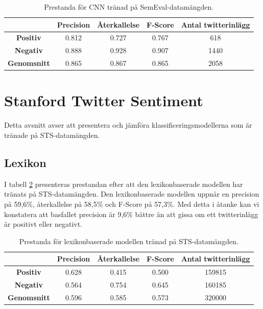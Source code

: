 \documentclass{kaumasters} %
\begin{document}
\begin{table}[H]
\centering
\caption{Prestanda för CNN tränad på SemEval-datamängden.}
\label{tab:cnn_se}
    \begin{tabular}{ccccc}
    \toprule
     & \textbf{Precision} & \textbf{Återkallelse} & \textbf{F-Score} & \textbf{Antal twitterinlägg}  \\
    \midrule
    \textbf{Positiv} & 0.812 & 0.727 & 0.767 & 618 \\
    \textbf{Negativ} & 0.888 & 0.928 & 0.907 & 1440 \\
    \midrule
    \textbf{Genomsnitt} & 0.865 & 0.867 & 0.865  & 2058 \\
    \bottomrule
\end{tabular}
\end{table}

\section{Stanford Twitter Sentiment}\label{res:sts}
Detta avsnitt avser att presentera och jämföra klassificeringsmodellerna som är tränade på STS-datamängden.

\subsection{Lexikon}
I tabell \ref{tab:lexi_sts} presenteras prestandan efter att den lexikonbaserade modellen har tränats på STS-datamängden. Den lexikonbaserade modellen uppnår en precision på 59,6\%, återkallelse på 58,5\% och F-Score på 57,3\%. Med detta i åtanke kan vi konstatera att basfallet precision är 9,6\% bättre än att gissa om ett twitterinlägg är positivt eller negativt.

\begin{table}[H]
\centering
\caption{Prestanda för lexikonbaserade modellen tränad på STS-datamängden.}
\label{tab:lexi_sts}
    \begin{tabular}{ccccc}
    \toprule
     & \textbf{Precision} & \textbf{Återkallelse} & \textbf{F-Score} & \textbf{Antal twitterinlägg}  \\
    \midrule
    \textbf{Positiv} & 0.628 & 0.415 & 0.500 & 159815 \\
    \textbf{Negativ} & 0.564 & 0.754 & 0.645 & 160185 \\
    \midrule
    \textbf{Genomsnitt} & 0.596 & 0.585 & 0.573  & 320000 \\
    \bottomrule
\end{tabular}
\end{table}
\end{document}
